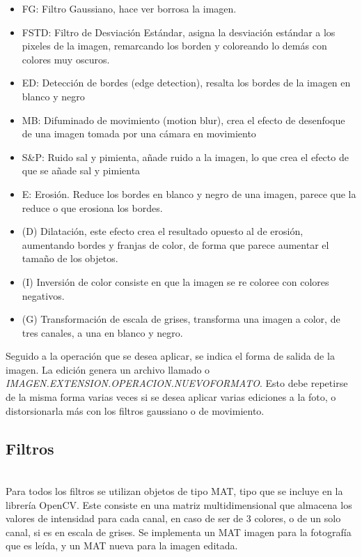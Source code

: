 \documentclass[11pt]{article}
\begin{document}
\begin{itemize}

    \item FG: Filtro Gaussiano, hace ver borrosa la imagen.
    \item FSTD: Filtro de Desviación Estándar, asigna la desviación estándar a los pixeles de la imagen, remarcando los borden y coloreando lo demás con colores muy oscuros.
    \item ED: Detección de bordes (edge detection), resalta los bordes de la imagen en blanco y negro
    \item MB: Difuminado de movimiento (motion blur), crea el efecto de desenfoque de una imagen tomada por una cámara en movimiento
    \item S&P: Ruido sal y pimienta, añade ruido a la imagen, lo que crea el efecto de que se añade sal y pimienta
    \item E: Erosión. Reduce los bordes en blanco y negro de una imagen, parece que la reduce o que erosiona los bordes.
    \item (D) Dilatación, este efecto crea el resultado opuesto al de erosión, aumentando bordes y franjas de color, de forma que parece aumentar el tamaño de los objetos.
    \item (I) Inversión de color consiste en que la imagen se re coloree con colores negativos.
    \item (G) Transformación de escala de grises, transforma una imagen a color, de tres canales, a una en blanco y negro.
    
\end{itemize}

Seguido a la operación que se desea aplicar, se indica el forma de salida de la imagen. La edición genera un archivo llamado o \textit{IMAGEN.EXTENSION.OPERACION.NUEVOFORMATO}. Esto debe repetirse de la misma forma varias veces si se desea aplicar varias ediciones a la foto, o distorsionarla más con los filtros gaussiano o de movimiento.


\subsection{Filtros}\\

Para todos los filtros se utilizan objetos de tipo MAT,  tipo que se incluye en la librería OpenCV. Este consiste en una matriz multidimensional que almacena los valores de intensidad para cada canal, en caso de ser de 3 colores, o de un solo canal, si es en escala de grises. Se implementa un MAT imagen para la fotografía que es leída, y un MAT nueva para la imagen editada.\\
\end{document}
